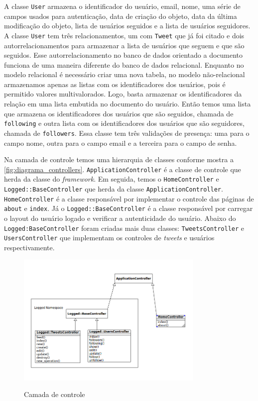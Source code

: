 A classe \verb|User| armazena o identificador do usuário, email, nome, uma série de campos usados para autenticação, data de criação do objeto, data da última modificação do objeto, lista de usuários seguidos e a lista de usuários seguidores. A classe \verb|User| tem três relacionamentos, um com \verb|Tweet| que já foi citado e dois autorrelacionamentos para armazenar a lista de usuários que seguem e que são seguidos. Esse autorrelacionamento no banco de dados orientado a documento funciona de uma maneira diferente do banco de dados relacional.
Enquanto no modelo relacional é necessário criar uma nova tabela, no modelo não-relacional armazenamos apenas as listas com os identificadores dos usuários, pois é permitido valores multivalorados. Logo, basta armazenar os identificadores da relação em uma lista embutida no documento do usuário. Então temos uma lista que armazena os identificadores dos usuários que são seguidos, chamada de \verb|following| e outra lista com os identificadores dos usuários que são seguidores, chamada de \verb|followers|.
Essa classe tem três validações de presença: uma para o campo nome, outra para o campo email e a terceira para o campo de senha.

Na camada de controle temos uma hierarquia de classes conforme mostra a \autoref{fig:diagrama_controllers}. \verb|ApplicationController| é a classe de controle que herda da classe do \textit{framework}. Em seguida, temos o \verb|HomeController| e \verb|Logged::BaseController| que herda  da classe \verb|ApplicationController|. \verb|HomeController| é a classe responsável por implementar o controle das páginas de \verb|about| e \verb|index|. Já o \verb|Logged::BaseController| é a classe responsável por carregar o layout do usuário logado e verificar a autenticidade do usuário.
Abaixo do \verb|Logged:BaseController| foram criadas mais duas classes: \verb|TweetsController| e \verb|UsersController| que implementam os controles de \textit{tweets} e usuários respectivamente.
\begin{figure}[H]
    \centering
    \caption{Camada de controle}
    \includegraphics[width=0.8\textwidth]{./04-figuras/controllers_complete.png}
    \label{fig:diagrama_controllers}
\end{figure}


